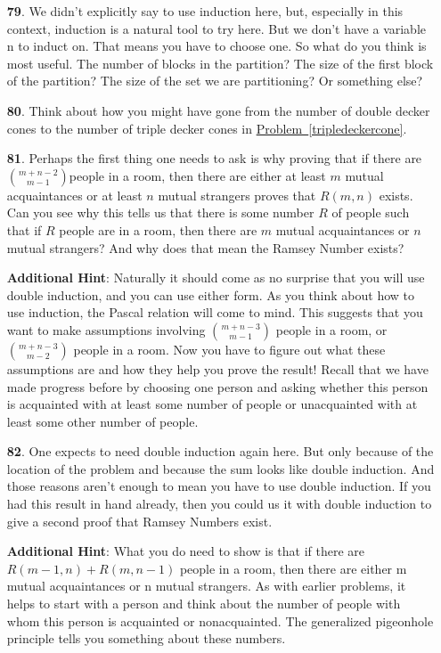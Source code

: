 \documentclass[10pt,]{book}
\theoremstyle{plain}
\theoremstyle{definition}
\theoremstyle{definition}
\numberwithin{equation}{chapter}
\begin{document}
\begin{itemize}[itemsep=1em]
\item[\textbf{79}.]We didn't explicitly say to use induction here, but, especially in this context, induction is a natural tool to try here. But we don't have a variable n to induct on. That means you have to choose one. So what do you think is most useful. The number of blocks in the partition? The size of the first block of the partition? The size of the set we are partitioning? Or something else?%

\item[\textbf{80}.]Think about how you might have gone from the number of double decker cones to the number of triple decker cones in \hyperref[tripledeckercone]{Problem~\ref{tripledeckercone}}.%

\item[\textbf{81}.]Perhaps the first thing one needs to ask is why proving that if there are \(\binom{m+n-2}{m-1}\)people in a room, then there are either at least \(m\) mutual acquaintances or at least \(n\) mutual strangers proves that \(R(m, n)\) exists. Can you see why this tells us that there is some number \(R\) of people such that if \(R\) people are in a room, then there are \(m\) mutual acquaintances or \(n\) mutual strangers? And why does that mean the Ramsey Number exists?%

\par\smallskip
\noindent\textbf{Additional Hint}: Naturally it should come as no surprise that you will use double induction, and you can use either form. As you think about how to use induction, the Pascal relation will come to mind. This suggests that you want to make assumptions involving \(\binom{m+n-3}{m-1}\) people in a room, or \(\binom{m+n-3}{m-2}\) people in a room. Now you have to figure out what these assumptions are and how they help you prove the result! Recall that we have made progress before by choosing one person and asking whether this person is acquainted with at least some number of people or unacquainted with at least some other number of people.%

\item[\textbf{82}.]One expects to need double induction again here. But only because of the location of the problem and because the sum looks like double induction. And those reasons aren't enough to mean you have to use double induction. If you had this result in hand already, then you could us it with double induction to give a second proof that Ramsey Numbers exist.%

\par\smallskip
\noindent\textbf{Additional Hint}: What you do need to show is that if there are \(R(m - 1, n) + R(m, n - 1)\) people in a room, then there are either m mutual acquaintances or n mutual strangers. As with earlier problems, it helps to start with a person and think about the number of people with whom this person is acquainted or nonacquainted. The generalized pigeonhole principle tells you something about these numbers.%


\end{itemize}
\end{document}
